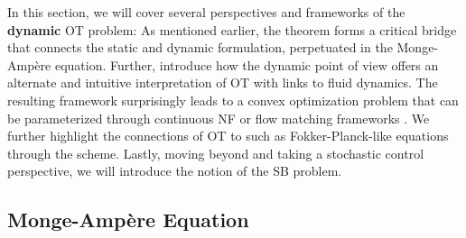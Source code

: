 In this section, we will cover several perspectives and frameworks of the \textbf{dynamic} \acrshort{OT} problem: As mentioned earlier, the \citeauthor{brenier1987decomposition} theorem  forms a critical bridge that connects the static and dynamic formulation, perpetuated in the Monge-Amp{\`e}re equation.
Further, \citet*{benamou2000computational} introduce how the dynamic point of view offers an alternate and intuitive interpretation of \acrlong{OT} with links to fluid dynamics. The resulting framework surprisingly leads to a convex optimization problem that can be parameterized through continuous \acrfull{NF} \citep{tong2020trajectorynet, chen2018neural} or flow matching frameworks \citep{lipman2023flow, liu2022flow, pooladian2023multisample, albergo2023stochastic}.
We further highlight the connections of \acrshort{OT} to  such as Fokker-Planck-like equations through the \citeauthor*{jordan1998variational} scheme.
Lastly, moving beyond  and taking a stochastic control perspective, we will introduce the notion of the \acrlong{SB} problem.


\subsection{Monge-Amp{\`e}re Equation} \label{sec:background_monge_ampere}


